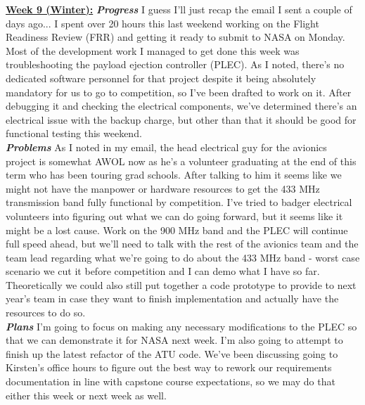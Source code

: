 \documentclass[onecolumn, draftclsnofoot, 10pt, compsoc]{IEEEtran}
\begin{document}
\underline{\textbf{Week 9 (Winter):}}
\newline\textbf{\textit{{Progress}}}
\newline I guess I'll just recap the email I sent a couple of days ago... I spent over 20 hours this last weekend working on the Flight Readiness Review (FRR) and getting it ready to submit to NASA on Monday. Most of the development work I managed to get done this week was troubleshooting the payload ejection controller (PLEC). As I noted, there's no dedicated software personnel for that project despite it being absolutely mandatory for us to go to competition, so I've been drafted to work on it. After debugging it and checking the electrical components, we've determined there's an electrical issue with the backup charge, but other than that it should be good for functional testing this weekend. \\

\textbf{\textit{{Problems}}}
\newline As I noted in my email, the head electrical guy for the avionics project is somewhat AWOL now as he's a volunteer graduating at the end of this term who has been touring grad schools. After talking to him it seems like we might not have the manpower or hardware resources to get the 433 MHz transmission band fully functional by competition. I've tried to badger electrical volunteers into figuring out what we can do going forward, but it seems like it might be a lost cause. Work on the 900 MHz band and the PLEC will continue full speed ahead, but we'll need to talk with the rest of the avionics team and the team lead regarding what we're going to do about the 433 MHz band - worst case scenario we cut it before competition and I can demo what I have so far. Theoretically we could also still put together a code prototype to provide to next year's team in case they want to finish implementation and actually have the resources to do so. \\

\textbf{\textit{{Plans}}}
\newline I'm going to focus on making any necessary modifications to the PLEC so that we can demonstrate it for NASA next week. I'm also going to attempt to finish up the latest refactor of the ATU code. We've been discussing going to Kirsten's office hours to figure out the best way to rework our requirements documentation in line with capstone course expectations, so we may do that either this week or next week as well. \\
\end{document}
